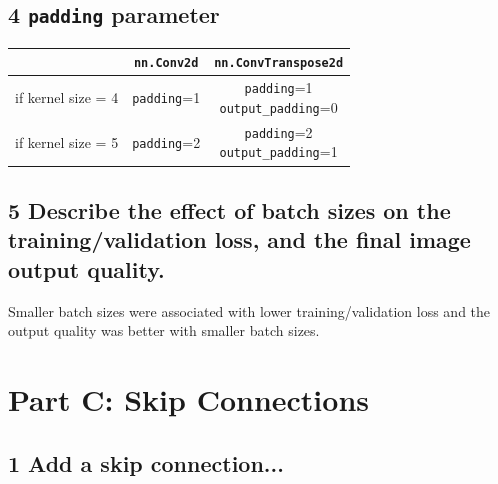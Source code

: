 \documentclass{article}
\begin{document}
\subsection*{4 \texttt{padding} parameter}

\begin{tabular}{ c c c }
	 & \texttt{nn.Conv2d}  & \texttt{nn.ConvTranspose2d} \\ 
	 \hline
	if kernel size = 4 & \texttt{padding}=1 & \makecell{\texttt{padding}=1 \\ \texttt{output\_padding}=0} \\  
	if kernel size = 5 & \texttt{padding}=2 & \makecell{\texttt{padding}=2 \\ \texttt{output\_padding}=1}
\end{tabular}


\subsection*{5 Describe  the  effect  of  batch  sizes  on  the  training/validation loss, and the final image output quality.}

Smaller batch sizes were associated with lower training/validation loss and the output quality was better with smaller batch sizes. 



\section{Part C: Skip Connections}

\subsection*{1 Add a skip connection...}
\end{document}
